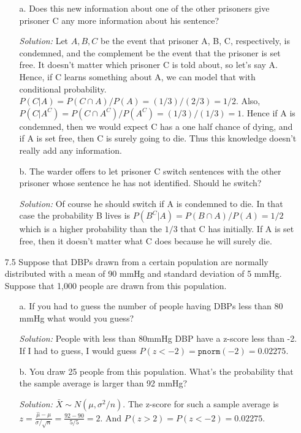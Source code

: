 \documentclass{article}
\begin{document}
\begin{enumerate}
\begin{enumerate}

\item[a.] Does this new information about one of the other prisoners give prisoner C any more information about his sentence?

\textit{Solution:} Let $A, B, C$ be the event that prisoner A, B, C, respectively, is condemned, and the complement be the event that the prisoner is set free. It doesn't matter which prisoner C is told about, so let's say A. Hence, if C learns something about A, we can model that with conditional probability. $P(C | A) = P(C \cap A) / P(A) = (1/3) / (2/3) = 1/2$. Also, $P(C | A^C) = P(C \cap A^C) / P(A^C) = (1/3) / (1/3) = 1$. Hence if A is condemned, then we would expect C has a one half chance of dying, and if A is set free, then C is surely going to die. Thus this knowledge doesn't really add any information.

\item[b.] The warder offers to let prisoner C switch sentences with the other prisoner whose sentence he has not identified. Should he switch?

\textit{Solution:} Of course he should switch if A is condemned to die. In that case the probability B lives is $P(B^C | A) = P(B \cap A)/P(A) = 1/2$ which is a higher probability than the $1/3$ that C has initially. If A is set free, then it doesn't matter what C does because he will surely die.

\end{enumerate}

\item[7.5] Suppose that DBPs drawn from a certain population are normally distributed with a mean of 90 mmHg and standard deviation of 5 mmHg. Suppose that 1,000 people are drawn from this population.

\begin{enumerate}

\item[a.] If you had to guess the number of people having DBPs less than 80 mmHg what would you guess?

\textit{Solution:} People with less than 80mmHg DBP have a z-score less than -2. If I had to guess, I would guess $P(z < -2) = \texttt{pnorm}(-2)=0.02275$.

\item[b.] You draw 25 people from this population. What’s the probability that the sample average is larger than 92 mmHg?

\textit{Solution:} $\bar{X} \sim N(\mu, \sigma^2/n)$.  The z-score for such a sample average is $z = \frac{\hat{\mu} - \mu}{\sigma / \sqrt{n}}=\frac{92-90}{5/5}=2$. And $P(z > 2) = P(z < -2) = 0.02275$.


\end{enumerate}
\end{enumerate}
\end{document}
